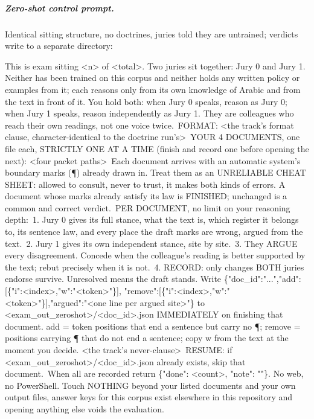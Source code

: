 \documentclass[11pt]{article}
\begin{document}
\subparagraph{Zero-shot control prompt.} Identical sitting structure, no doctrines,
juries told they are untrained; verdicts write to a separate directory:
\begin{tcolorbox}[colback=white, boxrule=0.4pt, left=3pt, right=3pt, top=3pt, bottom=3pt]
\scriptsize\ttfamily\raggedright
This is exam sitting <n> of <total>. Two juries sit together: Jury 0 and Jury 1.
Neither has been trained on this corpus and neither holds any written policy or
examples from it; each reasons only from its own knowledge of Arabic and from the text
in front of it. You hold both: when Jury 0 speaks, reason as Jury 0; when Jury 1
speaks, reason independently as Jury 1. They are colleagues who reach their own
readings, not one voice twice.\
FORMAT: <the track's format clause, character-identical to the doctrine run's>\
YOUR 4 DOCUMENTS, one file each, STRICTLY ONE AT A TIME (finish and record one before
opening the next): <four packet paths>\
Each document arrives with an automatic system's boundary marks (\P) already drawn in.
Treat them as an UNRELIABLE CHEAT SHEET: allowed to consult, never to trust, it makes
both kinds of errors. A document whose marks already satisfy its law is FINISHED;
unchanged is a common and correct verdict.\
PER DOCUMENT, no limit on your reasoning depth:\
1. Jury 0 gives its full stance, what the text is, which register it belongs to, its
sentence law, and every place the draft marks are wrong, argued from the text.\
2. Jury 1 gives its own independent stance, site by site.\
3. They ARGUE every disagreement. Concede when the colleague's reading is better
supported by the text; rebut precisely when it is not.\
4. RECORD: only changes BOTH juries endorse survive. Unresolved means the draft stands.
Write \{"doc\_id":"...",\allowbreak "add":[\{"i":<index>,\allowbreak "w":"<token>"\}],\allowbreak
"remove":[\{"i":<index>,\allowbreak "w":"<token>"\}],\allowbreak "argued":"<one line per argued
site>"\} to <exam\_out\_zeroshot>/<doc\_id>.json IMMEDIATELY on finishing that document.
add = token positions that end a sentence but carry no \P; remove = positions carrying
\P{} that do not end a sentence; copy w from the text at the moment you decide. <the
track's never-clause>\
RESUME: if <exam\_out\_zeroshot>/<doc\_id>.json already exists, skip that document.\
When all are recorded return \{"done": <count>, "note": ""\}. No web, no PowerShell.
Touch NOTHING beyond your listed documents and your own output files, answer keys for
this corpus exist elsewhere in this repository and opening anything else voids the
evaluation.
\end{tcolorbox}
\end{document}
